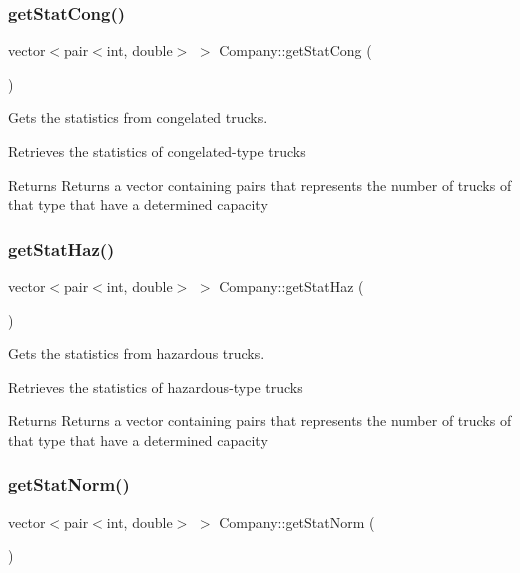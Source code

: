 \subsubsection{\texorpdfstring{get\+Stat\+Cong()}{getStatCong()}}
{\footnotesize\ttfamily vector$<$pair$<$int, double$>$ $>$ Company\+::get\+Stat\+Cong (\begin{DoxyParamCaption}{ }\end{DoxyParamCaption})\hspace{0.3cm}{\ttfamily [inline]}}



Gets the statistics from congelated trucks. 

Retrieves the statistics of congelated-\/type trucks

\begin{DoxyReturn}{Returns}
Returns a vector containing pairs that represents the number of trucks of that type that have a determined capacity 
\end{DoxyReturn}
\mbox{\label{class_company_aa37fd8b5214cc269f8f1a0d9b23d2c61}} 
\subsubsection{\texorpdfstring{get\+Stat\+Haz()}{getStatHaz()}}
{\footnotesize\ttfamily vector$<$pair$<$int, double$>$ $>$ Company\+::get\+Stat\+Haz (\begin{DoxyParamCaption}{ }\end{DoxyParamCaption})\hspace{0.3cm}{\ttfamily [inline]}}



Gets the statistics from hazardous trucks. 

Retrieves the statistics of hazardous-\/type trucks

\begin{DoxyReturn}{Returns}
Returns a vector containing pairs that represents the number of trucks of that type that have a determined capacity 
\end{DoxyReturn}
\mbox{\label{class_company_aec149faa3a58555957f83df920897253}} 
\subsubsection{\texorpdfstring{get\+Stat\+Norm()}{getStatNorm()}}
{\footnotesize\ttfamily vector$<$pair$<$int, double$>$ $>$ Company\+::get\+Stat\+Norm (\begin{DoxyParamCaption}{ }\end{DoxyParamCaption})\hspace{0.3cm}{\ttfamily [inline]}}



